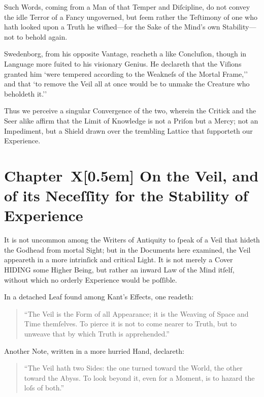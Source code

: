\documentclass[12pt]{book}
\begin{document}
Such Words, coming from a Man of that Temper and Diſcipline, do not convey the idle Terror of a Fancy ungoverned, but ſeem rather the Teſtimony of one who hath looked upon a Truth he wiſhed­—for the Sake of the Mind’s own Stability—not to behold again.

Swedenborg, from his opposite Vantage, reacheth a like Concluſion, though in Language more ſuited to his visionary Genius. He declareth that the Viſions granted him `were tempered according to the Weakneſs of the Mortal Frame,'' and that `to remove the Veil all at once would be to unmake the Creature who beholdeth it.''

Thus we perceive a singular Convergence of the two, wherein the Critick and the Seer alike affirm that the Limit of Knowledge is not a Priſon but a Mercy; not an Impediment, but a Shield drawn over the trembling Lattice that ſupporteth our Experience.


\chapter*{Chapter~X[0.5em]
On the Veil, and of its Neceſſity for the Stability of Experience}


It is not uncommon among the Writers of Antiquity to ſpeak of a Veil that hideth the Godhead from mortal Sight; but in the Documents here examined, the Veil appeareth in a more intrinſick and critical Light. It is not merely a Cover HIDING some Higher Being, but rather an inward Law of the Mind itſelf, without which no orderly Experience would be poſſible.

In a detached Leaf found among Kant’s Effects, one readeth:

\begin{quote}
``The Veil is the Form of all Appearance; it is the Weaving of Space and Time themſelves. To pierce it is not to come nearer to Truth, but to unweave that by which Truth is apprehended.''
\end{quote}

Another Note, written in a more hurried Hand, declareth:

\begin{quote}
``The Veil hath two Sides: the one turned toward the World, the other toward the Abyss. To look beyond it, even for a Moment, is to hazard the loſs of both.''
\end{quote}
\end{document}
